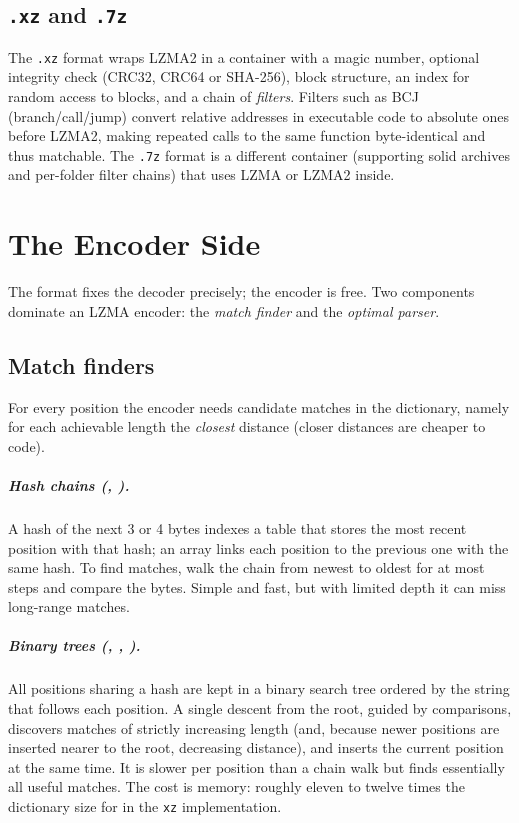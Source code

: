 \documentclass[11pt,a4paper,oneside]{book}
\newcommand{\code}[1]{\texttt{\detokenize{#1}}}
\begin{document}
\section{\texttt{.xz} and \texttt{.7z}}

The \texttt{.xz} format wraps LZMA2 in a container with a magic number, optional integrity check (CRC32, CRC64 or SHA-256), block structure, an index for random access to blocks, and
a chain of \emph{filters}. Filters such as BCJ (branch/call/jump) convert relative addresses in executable code to absolute ones before LZMA2, making repeated calls to the same function
byte-identical and thus matchable. The \texttt{.7z} format is a different container (supporting solid archives and per-folder filter chains) that uses LZMA or LZMA2 inside.

\chapter{The Encoder Side}

The format fixes the decoder precisely; the encoder is free. Two components dominate an LZMA encoder: the \emph{match finder} and the \emph{optimal parser}.

\section{Match finders}

For every position the encoder needs candidate matches in the dictionary, namely for each achievable length the \emph{closest} distance (closer distances are cheaper to code).

\paragraph{Hash chains (\code{hc3}, \code{hc4}).}
A hash of the next 3 or 4 bytes indexes a table that stores the most recent position with that hash; an array \code{prev[pos]} links each position to the previous one with the same hash.
To find matches, walk the chain from newest to oldest for at most \code{depth} steps and compare the bytes. Simple and fast, but with limited depth it can miss long-range matches.

\paragraph{Binary trees (\code{bt2}, \code{bt3}, \code{bt4}).}
All positions sharing a hash are kept in a binary search tree ordered by the string that follows each position. A single descent from the root, guided by comparisons,
discovers matches of strictly increasing length (and, because newer positions are inserted nearer to the root, decreasing distance), and inserts the current position
at the same time. It is slower per position than a chain walk but finds essentially all useful matches. The cost is memory: roughly eleven to twelve times the dictionary size for
\code{bt4} in the \texttt{xz} implementation.
\end{document}
